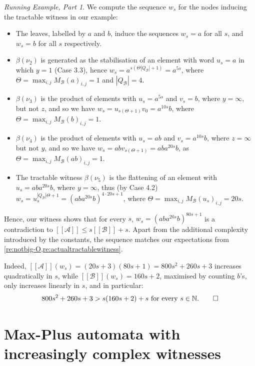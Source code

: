\documentclass[10pt,a4paper]{amsart}
\theoremstyle{definition}
\numberwithin{equation}{section}
\theoremstyle{remark}
\newcommand{\autA}{\mathcal{A}}
\newcommand{\autB}{\mathcal{B}}
\newcommand{\brfunc}[1]{[\![#1]\!]}
\newcommand{\funcA}{\brfunc{\autA}}
\newcommand{\funcB}{\brfunc{\autB}}
\theoremstyle{remark}
\newtheorem{runningexample/}{Running Example, Part}
\newenvironment{runningexample}
  {\renewcommand{\qedsymbol}{\color{darkgray}\ensuremath{\lrcorner}}%
   \pushQED{\qed}\begin{runningexample/}}
  {\popQED\end{runningexample/}}
\begin{document}
\begin{runningexample}
We compute the sequence $w_s$ for the nodes inducing the tractable witness in our example:
\begin{itemize}
\item The leaves, labelled by $a$ and $b$, induce the sequences $w_s = a$ for all $s$, and $w_s = b$ for all $s$ respectively.
\item $\beta(\nu_2)$ is generated as the stabilisation of an element with word $u_s = a$ in which $y = 1$ (Case 3.3), hence $w_s = a^{s(\Theta |Q_\autB| + 1)} = a^{5s}$, where $\Theta =\max_{i,j} M_\autB(a)_{i,j} = 1$ and $|Q_\autB| = 4$.
\item $\beta(\nu_3)$ is the product of elements with $u_s = a^{5s}$ and $v_s = b$, where $y= \infty$, but not $z$, and so we have $w_s = u_{s(\Theta+1)}v_0 = a^{10s}b $, where $\Theta  =\max_{i,j} M_\autB(b)_{i,j} = 1$.
\item $\beta(\nu_4)$ is the product of elements with $u_s = ab$ and $v_s = a^{10s}b$, where $z= \infty$ but not $y$, and so we have $w_s = ab v_{s(\Theta+1)}= ab a^{20s}b$, as $\Theta =\max_{i,j} M_\autB(ab)_{i,j} = 1$.
\item The tractable witness $\beta(\nu_5)$ is the flattening of an element with $u_s = aba^{20s}b$, where $y= \infty$, thus (by Case 4.2) $w_s = u_s^{|Q_\autB|\Theta + 1} = (aba^{20s}b)^{4\cdot 20s + 1} $, where $\Theta  =\max_{i,j} M_\autB(u_s)_{i,j} =  20s$.
\end{itemize}
Hence, our witness shows that for every $s$, $w_s=(aba^{20s}b)^{80s + 1}$ is a contradiction to $\funcA \le s \funcB + s$. Apart from the additional complexity introduced by the constants, the sequence matches our expectations from \cref{re:notbig-O,re:actualtractablewitness}.

Indeed, $\funcA(w_s) = (20s+3)(80s+1) = 800s^2 +260s+3$ increases quadratically in $s$, while $\funcB(w_s) = 160s + 2$, maximised by counting $b$'s, only increases linearly in $s$, and in particular:
\[
800s^2 +260s+3 > s(160s+2) + s \text{ for every }s \in\mathbb{N}.\qedhere
\]
\end{runningexample}


\section{Max-Plus automata with increasingly complex witnesses}
\label{sec:example}
\end{document}
